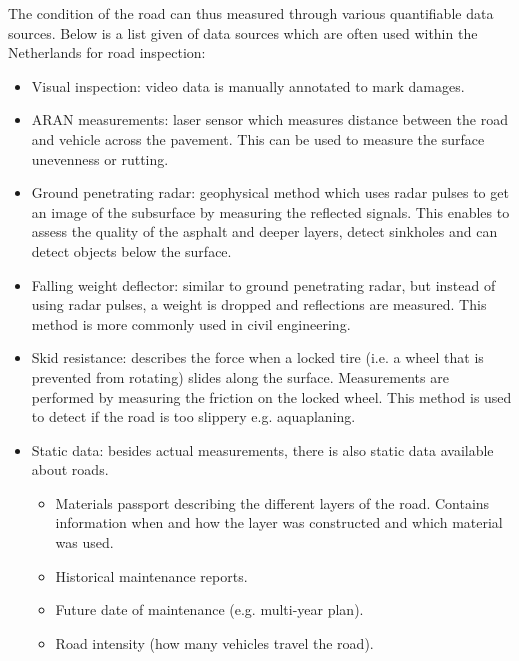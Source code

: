 The condition of the road can thus measured through various quantifiable data sources. Below is a list given of data sources which are often used within the Netherlands for road inspection:
\begin{itemize}
\item Visual inspection: video data is manually annotated to mark damages.
\item ARAN measurements: laser sensor which measures distance between the road and vehicle across the pavement. This can be used to measure the surface unevenness or rutting.
\end{itemize}
\begin{itemize}
\item Ground penetrating radar: geophysical method which uses radar pulses to get an image of the subsurface by measuring the reflected signals. This enables to assess the quality of the asphalt and deeper layers, detect sinkholes and can detect objects below the surface.
\item Falling weight deflector: similar to ground penetrating radar, but instead of using radar pulses, a weight is dropped and reflections are measured. This method is more commonly used in civil engineering. 
\item Skid resistance: describes the force when a locked tire (i.e. a wheel that is prevented from rotating) slides along the surface. Measurements are performed by measuring the friction on the locked wheel. This method is used to detect if the road is too slippery e.g. aquaplaning.
\item Static data:  besides actual measurements, there is also static data available about roads.
\begin{itemize}
\item Materials passport describing the different layers of the road. Contains information when and how the layer was constructed and which material was used.
\item Historical maintenance reports.
\item Future date of maintenance (e.g. multi-year plan). 
\item Road intensity (how many vehicles travel the road).
\end{itemize}
    
\end{itemize}
